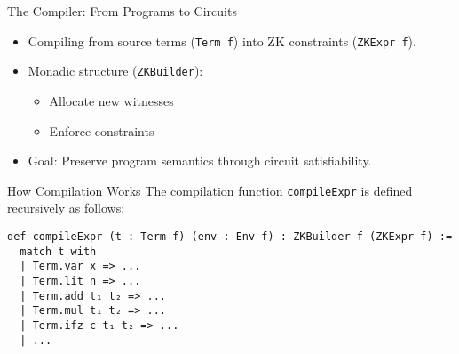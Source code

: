 \documentclass[aspectratio=169]{beamer}
\begin{document}
\begin{frame}{The Compiler: From Programs to Circuits}
\begin{itemize}
    \item Compiling from source terms (\texttt{Term f}) into ZK constraints (\texttt{ZKExpr f}).
    \item Monadic structure (\texttt{ZKBuilder}):
    \begin{itemize}
        \item Allocate new witnesses
        \item Enforce constraints
    \end{itemize}
    \item Goal: Preserve program semantics through circuit satisfiability.
\end{itemize}
\end{frame}
\begin{frame}[fragile]{How Compilation Works}
The compilation function \texttt{compileExpr} is defined recursively as follows:
\begin{lstlisting}
def compileExpr (t : Term f) (env : Env f) : ZKBuilder f (ZKExpr f) :=
  match t with
  | Term.var x => ...
  | Term.lit n => ...
  | Term.add t₁ t₂ => ...
  | Term.mul t₁ t₂ => ...
  | Term.ifz c t₁ t₂ => ...
  | ...
\end{lstlisting}
\end{frame}
    

\end{document}
